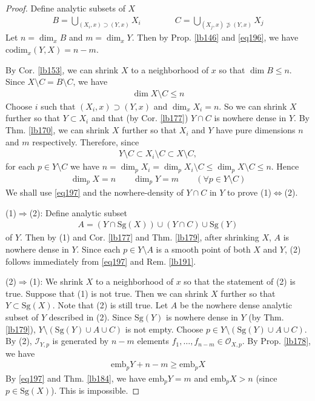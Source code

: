 \documentclass[12pt,b5paper,notitlepage]{report}
\theoremstyle{definition}
\theoremstyle{plain}
\newcommand{\scr}{\mathscr}
\newcommand{\emb}{\mathrm{emb}}
\newcommand{\Sg}{\mathrm{Sg}}
\newcommand{\codim}{\mathrm{codim}}
\numberwithin{equation}{section}
\begin{document}
\begin{proof}
Define analytic subsets of $X$
\begin{align}
B=\bigcup_{(X_i,x)\supset (Y,x)}X_i\qquad\qquad C=\bigcup_{(X_j,x)\nsupset (Y,x)}X_j \label{eq198}
\end{align}
Let $n=\dim_x B$ and $m=\dim_xY$. Then by Prop. \ref{lb146} and \eqref{eq196}, we have $\codim_x(Y,X)=n-m$. 

By Cor. \ref{lb153}, we can shrink $X$ to a neighborhood of $x$ so that $\dim B\leq n$. Since $X\setminus C=B\setminus C$, we have
\begin{align}
\dim X\setminus C\leq n \label{eq199}
\end{align}
Choose $i$ such that $(X_i,x)\supset (Y,x)$ and $\dim_x X_i=n$. So we can shrink $X$ further so that $Y\subset X_i$ and that (by Cor. \ref{lb177}) $Y\cap C$ is nowhere dense in $Y$. By Thm. \ref{lb170}, we can shrink $X$ further so that $X_i$ and $Y$ have pure dimensions $n$ and $m$ respectively. Therefore, since
\begin{align*}
Y\setminus C\subset X_i\setminus C\subset X\setminus C,
\end{align*}
for each $p\in Y\setminus C$ we have $n=\dim_p X_i=\dim_p X_i\setminus C\leq \dim_p X\setminus C\leq n$. Hence
\begin{align}
\dim_p X=n\qquad \dim_p Y=m \qquad(\forall p\in Y\setminus C) \label{eq197}
\end{align}
We shall use \eqref{eq197} and the nowhere-density of $Y\cap C$ in $Y$ to prove (1)$\Leftrightarrow$(2).

(1)$\Rightarrow$(2): Define analytic subset
\begin{align*}
A=(Y\cap\Sg(X))\cup(Y\cap C)\cup\Sg(Y)
\end{align*}
of $Y$. Then by (1) and Cor. \ref{lb177} and Thm. \ref{lb179}, after shrinking $X$, $A$ is nowhere dense in $Y$. Since each $p\in Y\setminus A$ is a smooth point of both $X$ and $Y$, (2) follows immediately from \eqref{eq197} and Rem. \ref{lb191}.



(2)$\Rightarrow$(1): We shrink $X$ to a neighborhood of $x$ so that the statement of (2) is true. Suppose that (1) is not true. Then we can shrink $X$ further so that $Y\subset \Sg(X)$. Note that (2) is still true. Let $A$ be the nowhere dense analytic subset of $Y$ described in (2). Since $\Sg(Y)$ is nowhere dense in $Y$ (by Thm. \ref{lb179}), $Y\setminus(\Sg(Y)\cup A\cup C)$ is not empty. Choose $p\in Y\setminus(\Sg(Y)\cup A\cup C)$. By (2), $\scr I_{Y,p}$ is generated by $n-m$ elements $f_1,\dots,f_{n-m}\in\scr O_{X,p}$. By Prop. \ref{lb178}, we have
\begin{align*}
\emb_p Y+n-m\geq\emb_p X
\end{align*}
By \eqref{eq197} and Thm. \ref{lb184}, we have $\emb_p Y=m$ and $\emb_pX>n$ (since $p\in\Sg(X)$). This is impossible.
\end{proof}
\end{document}
